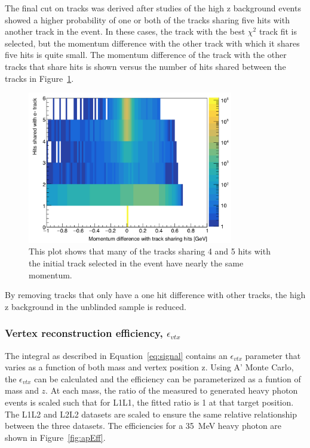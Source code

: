 The final cut on tracks was derived after studies of the high z background events showed a higher probability of one or both of the tracks sharing five hits with another track in the event. In these cases, the track with the best $\chi^2$ track fit is selected, but the momentum difference with the other track with which it shares five hits is quite small. The momentum difference of the track with the other tracks that share hits is shown versus the number of hits shared between the tracks in Figure~\ref{fig:trkshare}.

\begin{figure}[H]
  \centering
      \includegraphics[width=0.8\textwidth]{plots/TrkShareHits.png}
  \caption{This plot shows that many of the tracks sharing 4 and 5 hits with the initial track selected in the event have nearly the same momentum.}
  \label{fig:trkshare}
\end{figure} 

By removing tracks that only have a one hit difference with other tracks, the high z background in the unblinded sample is reduced.   


\subsubsection{Vertex reconstruction efficiency, $\epsilon_{vtx}$}

The integral as described in Equation~\eqref{eq:signal} contains an $\epsilon_{vtx}$ parameter that varies as a function of both mass and vertex position z. Using A' Monte Carlo, the $\epsilon_{vtx}$ can be calculated and the efficiency can be parameterized as a funtion of mass and $z$. At each mass, the ratio of the measured to generated heavy photon events is scaled such that for L1L1, the fitted ratio is 1 at that target position. The L1L2 and L2L2 datasets are scaled to ensure the same relative relationship between the three datasets. The efficiencies for a 35~MeV heavy photon are shown in Figure~\ref{fig:apEff}. 

